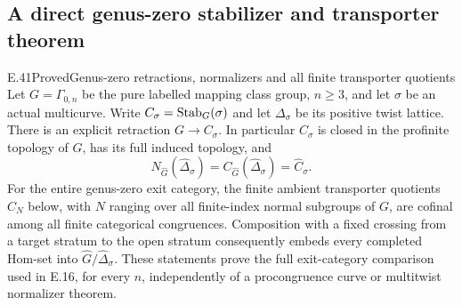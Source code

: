 \subsection{A direct genus-zero stabilizer and transporter theorem}

\begin{result}{E.41}{Proved}{Genus-zero retractions, normalizers and all finite transporter quotients}
Let $G=\Gamma_{0,n}$ be the pure labelled mapping class group,
$n\geq3$, and let $\sigma$ be an actual multicurve.  Write
$C_\sigma=\operatorname{Stab}_G(\sigma)$ and let $\Delta_\sigma$ be its
positive twist lattice.  There is an explicit retraction
$G\to C_\sigma$.  In particular $C_\sigma$ is closed in the
profinite topology of $G$, has its full induced topology, and
\[
 N_{\widehat G}(\widehat\Delta_\sigma)
 =C_{\widehat G}(\widehat\Delta_\sigma)
 =\widehat C_\sigma.                                         \tag{E.170}
\]
For the entire genus-zero exit category, the finite ambient
transporter quotients $C_N$ below, with $N$ ranging over all
finite-index normal subgroups of $G$, are cofinal among all
finite categorical congruences.  Composition with a fixed
crossing from a target stratum to the open stratum consequently
embeds every completed Hom-set into
$\widehat G/\widehat\Delta_\sigma$.
These statements prove the full exit-category comparison used
in E.16, for every $n$, independently of a procongruence curve
or multitwist normalizer theorem.
\end{result}
